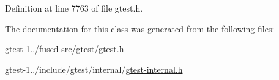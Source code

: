 \-Definition at line 7763 of file gtest.\-h.



\-The documentation for this class was generated from the following files\-:\begin{DoxyCompactItemize}
\item 
gtest-\/1../fused-\/src/gtest/\hyperlink{fused-src_2gtest_2gtest_8h}{gtest.\-h}\item 
gtest-\/1../include/gtest/internal/\hyperlink{gtest-internal_8h}{gtest-\/internal.\-h}\end{DoxyCompactItemize}
